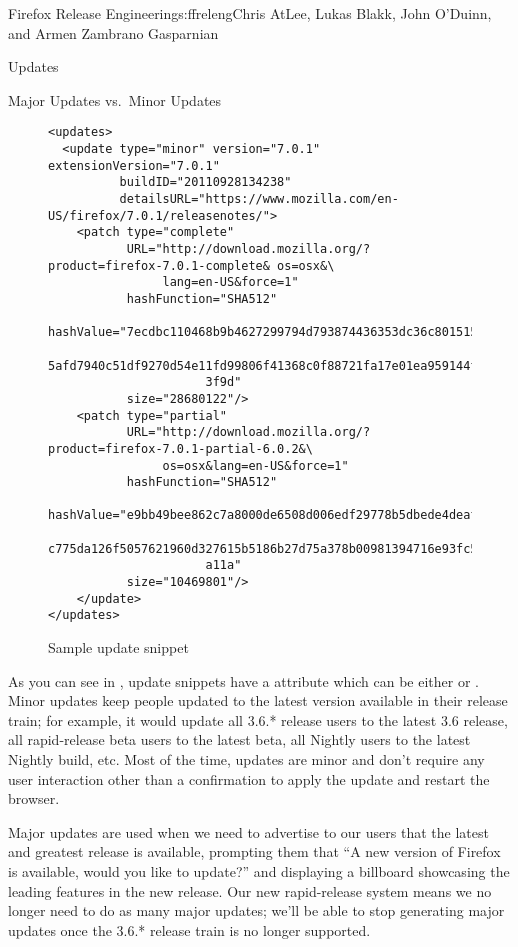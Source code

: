 \begin{aosachapter}{Firefox Release Engineering}{s:ffreleng}{Chris AtLee, Lukas Blakk, John O'Duinn, and Armen Zambrano Gasparnian}
\begin{aosasect1}{Updates}
\begin{aosasect2}{Major Updates vs.\ Minor Updates}

\begin{figure}  
\begin{verbatim}
<updates>
  <update type="minor" version="7.0.1" extensionVersion="7.0.1"
          buildID="20110928134238"
          detailsURL="https://www.mozilla.com/en-US/firefox/7.0.1/releasenotes/">
    <patch type="complete"
           URL="http://download.mozilla.org/?product=firefox-7.0.1-complete& os=osx&\
                lang=en-US&force=1"
           hashFunction="SHA512"
           hashValue="7ecdbc110468b9b4627299794d793874436353dc36c80151550b08830f9d8c\
                      5afd7940c51df9270d54e11fd99806f41368c0f88721fa17e01ea959144f47\
                      3f9d"
           size="28680122"/>
    <patch type="partial"
           URL="http://download.mozilla.org/?product=firefox-7.0.1-partial-6.0.2&\
                os=osx&lang=en-US&force=1"
           hashFunction="SHA512"
           hashValue="e9bb49bee862c7a8000de6508d006edf29778b5dbede4deaf3cfa05c22521f\
                      c775da126f5057621960d327615b5186b27d75a378b00981394716e93fc5cc\
                      a11a"
           size="10469801"/>
    </update>
</updates>
\end{verbatim}
\caption{Sample update snippet}
\label{fig.ffreleng.snippet}
\end{figure}

As you can see in , update snippets
have a  attribute which can be either  or 
\code{minor}.
Minor updates keep people updated to the latest version
available in their release train; for example, it would update all
3.6.* release users to the latest 3.6 release, all rapid-release beta
users to the latest beta, all Nightly users to the
latest Nightly build, etc.  Most of the time, updates are minor and
don't require any user interaction other than a confirmation to apply the
update and restart the browser.

Major updates are used when we need to advertise to our users that the
latest and greatest release is available, prompting them that
``A new version of Firefox is available, would you
like to update?'' and displaying a billboard showcasing the leading 
features in the new release.  Our new rapid-release system means we no
longer need to do as many major updates; we'll be able to stop
generating major updates once the 3.6.* release train is no longer supported.


\end{aosasect2}
\end{aosasect1}
\end{aosachapter}
